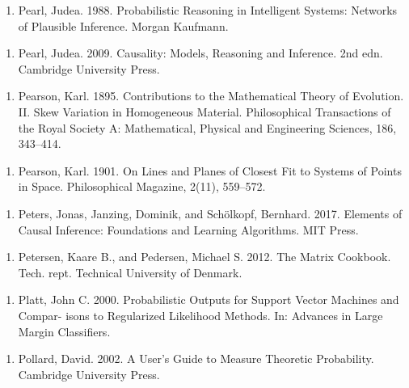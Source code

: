 \begin{enumerate}
\item Pearl, Judea. 1988. Probabilistic Reasoning in Intelligent Systems: Networks of Plausible Inference. Morgan Kaufmann.
\end{enumerate}

\begin{enumerate}
\item Pearl, Judea. 2009. Causality: Models, Reasoning and Inference. 2nd edn. Cambridge University Press.
\end{enumerate}

\begin{enumerate}
\item Pearson, Karl. 1895. Contributions to the Mathematical Theory of Evolution. II. Skew Variation in Homogeneous Material. Philosophical Transactions of the Royal Society A: Mathematical, Physical and Engineering Sciences, 186, 343–414.
\end{enumerate}

\begin{enumerate}
\item Pearson, Karl. 1901. On Lines and Planes of Closest Fit to Systems of Points in Space. Philosophical Magazine, 2(11), 559–572.
\end{enumerate}

\begin{enumerate}
\item Peters, Jonas, Janzing, Dominik, and Schölkopf, Bernhard. 2017. Elements of Causal Inference: Foundations and Learning Algorithms. MIT Press.
\end{enumerate}

\begin{enumerate}
\item Petersen, Kaare B., and Pedersen, Michael S. 2012. The Matrix Cookbook. Tech. rept. Technical University of Denmark.
\end{enumerate}

\begin{enumerate}
\item Platt, John C. 2000. Probabilistic Outputs for Support Vector Machines and Compar- isons to Regularized Likelihood Methods. In: Advances in Large Margin Classiﬁers.
\end{enumerate}

\begin{enumerate}
\item Pollard, David. 2002. A User’s Guide to Measure Theoretic Probability. Cambridge University Press.
\end{enumerate}

